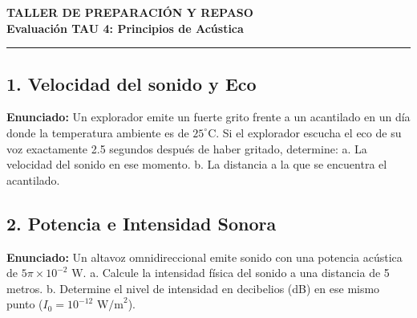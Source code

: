 \documentclass[12pt, letterpaper]{article}
\begin{document}
\newpage
\begin{center}
	{\LARGE \textbf{TALLER DE PREPARACIÓN Y REPASO}}\\[0.2cm]
	{\Large \textbf{Evaluación TAU 4: Principios de Acústica}}\\[0.1cm]
	\hrule
\end{center}

\vspace{0.5cm}

\subsection*{1. Velocidad del sonido y Eco}
\noindent \textbf{Enunciado:} Un explorador emite un fuerte grito frente a un acantilado en un día donde la temperatura ambiente es de $25^{\circ}\text{C}$. Si el explorador escucha el eco de su voz exactamente 2.5 segundos después de haber gritado, determine: a. La velocidad del sonido en ese momento. b. La distancia a la que se encuentra el acantilado.


\subsection*{2. Potencia e Intensidad Sonora}
\noindent \textbf{Enunciado:} Un altavoz omnidireccional emite sonido con una potencia acústica de $5\pi \times 10^{-2} \text{ W}$. a. Calcule la intensidad física del sonido a una distancia de 5 metros. b. Determine el nivel de intensidad en decibelios (dB) en ese mismo punto ($I_0 = 10^{-12} \text{ W/m}^2$).
\end{document}
